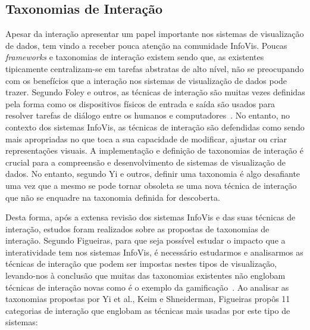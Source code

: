 \subsection{Taxonomias de Interação}
\label{sub:taxonomias_interacao}

Apesar da interação apresentar um papel importante nos sistemas de visualização de dados, tem vindo a receber pouca atenção na comunidade \gls{InfoVis}. Poucas \textit{frameworks} e taxonomias de interação existem sendo que, as existentes tipicamente centralizam-se em tarefas abstratas de alto nível, não se preocupando com os benefícios que a interação nos sistemas de visualização de dados pode trazer. Segundo Foley e outros, as técnicas de interação são muitas vezes definidas pela forma como os dispositivos físicos de entrada e saída são usados para resolver tarefas de diálogo entre os humanos e computadores~\cite{foley1996computer}. No entanto, no contexto dos sistemas \gls{InfoVis}, as técnicas de interação são defendidas como sendo mais apropriadas no que toca a sua capacidade de modificar, ajustar ou criar representações visuais. A implementação e definição de taxonomias de interação é crucial para a compreensão e desenvolvimento de sistemas de visualização de dados. No entanto, segundo Yi e outros, definir uma taxonomia é algo desafiante uma vez que a mesmo se pode tornar obsoleta se uma nova técnica de interação que não se enquadre na taxonomia definida for descoberta.

Desta forma, após a extensa revisão dos sistemas \gls{InfoVis} e das suas técnicas de interação, estudos foram realizados sobre as propostas de taxonomias de interação. Segundo Figueiras, para que seja possível estudar o impacto que a interatividade tem nos sistemas \gls{InfoVis}, é necessário estudarmos e analisarmos as técnicas de interação que podem ser impostas nestes tipos de visualização, levando-nos à conclusão que muitas das taxonomias existentes não englobam técnicas de interação novas como é o exemplo da gamificação~\cite{figueiras2015towards}. Ao analisar as taxonomias propostas por Yi et al., Keim  e Shneiderman, Figueiras propôs 11 categorias de interação que englobam as técnicas mais usadas por este tipo de sistemas:

